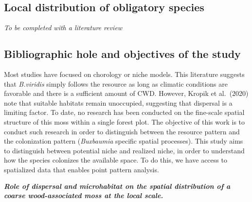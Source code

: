 \documentclass[
  letterpaper,
  DIV=11,
  numbers=noendperiod]{scrartcl}
\begin{document}
\subsection{Local distribution of obligatory
species}\label{local-distribution-of-obligatory-species}

\begin{tcolorbox}[enhanced jigsaw, breakable, colback=white, opacityback=0, bottomtitle=1mm, arc=.35mm, rightrule=.15mm, colbacktitle=quarto-callout-note-color!10!white, titlerule=0mm, colframe=quarto-callout-note-color-frame, toprule=.15mm, opacitybacktitle=0.6, coltitle=black, left=2mm, bottomrule=.15mm, leftrule=.75mm, toptitle=1mm, title=\textcolor{quarto-callout-note-color}{\faInfo}\hspace{0.5em}{Title idea}]

\emph{To be completed with a literature review}

\end{tcolorbox}

\subsection{Bibliographic hole and objectives of the
study}\label{bibliographic-hole-and-objectives-of-the-study}

Most studies have focused on chorology or niche models. This literature
suggests that \emph{B.viridis} simply follows the resource as long as
climatic conditions are favorable and there is a sufficient amount of
CWD. However, Kropik et al.~(2020) note that suitable habitats remain
unoccupied, suggesting that dispersal is a limiting factor. To date, no
research has been conducted on the fine-scale spatial structure of this
moss within a single forest plot. The objective of this work is to
conduct such research in order to distinguish between the resource
pattern and the colonization pattern (\emph{Buxbaumia} specific spatial
processes). This study aims to distinguish between potential niche and
realized niche, in order to understand how the species colonizes the
available space. To do this, we have access to spatialized data that
enables point pattern analysis.

\begin{tcolorbox}[enhanced jigsaw, breakable, colback=white, opacityback=0, bottomtitle=1mm, arc=.35mm, rightrule=.15mm, colbacktitle=quarto-callout-note-color!10!white, titlerule=0mm, colframe=quarto-callout-note-color-frame, toprule=.15mm, opacitybacktitle=0.6, coltitle=black, left=2mm, bottomrule=.15mm, leftrule=.75mm, toptitle=1mm, title=\textcolor{quarto-callout-note-color}{\faInfo}\hspace{0.5em}{Title idea}]

\textbf{\emph{Role of dispersal and microhabitat on the spatial
distribution of a coarse wood-associated moss at the local scale.}}

\end{tcolorbox}
\end{document}
